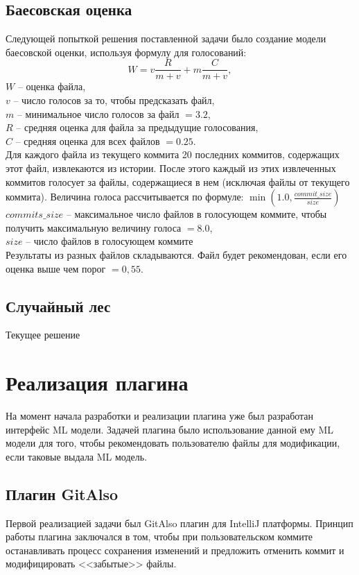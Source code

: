 \documentclass[times]{itmo-student-thesis}
\begin{document}
\section{Баесовская оценка}
Следующей попыткой решения поставленной задачи было создание модели баесовской оценки, используя формулу для голосований:
    $$W = v\frac{R}{m + v} + m\frac{C}{m + v},$$
$W$ -- оценка файла, \\
$v$ -- число голосов за то, чтобы предсказать файл, \\
$m$ -- минимальное число голосов за файл $= 3.2$, \\
$R$ -- средняя оценка для файла за предыдущие голосования, \\
${C}$ -- средняя оценка для всех файлов $= 0.25$. \\
Для каждого файла из текущего коммита 20 последних коммитов, содержащих этот файл, извлекаются из истории. После этого каждый из этих извлеченных коммитов голосует за файлы, содержащиеся в нем (исключая файлы от текущего коммита). Величина голоса рассчитывается по формуле: $\min(1.0, \frac{{commit\_size}}{{size}})$\\
$commits\_size$ --  максимальное число файлов в голосующем коммите, чтобы получить максимальную величину голоса $= 8.0$,\\
$size$ -- число файлов в голосующем коммите\\
Результаты из разных файлов складываются. Файл будет рекомендован, если его оценка выше чем порог $= 0,55$.
\section{Случайный лес}
Текущее решение






\chapter{Реализация плагина}
На момент начала разработки и реализации плагина уже был разработан интерфейс ML модели. Задачей плагина было использование данной ему ML модели для того, чтобы рекомендовать пользователю файлы для модификации, если таковые выдала ML модель.
\section{Плагин GitAlso}
Первой реализацией задачи был GitAlso плагин для IntelliJ платформы. Принцип работы плагина заключался в том, чтобы при пользовательском коммите останавливать процесс сохранения изменений и предложить отменить коммит и модифицировать <<забытые>> файлы.
\end{document}
